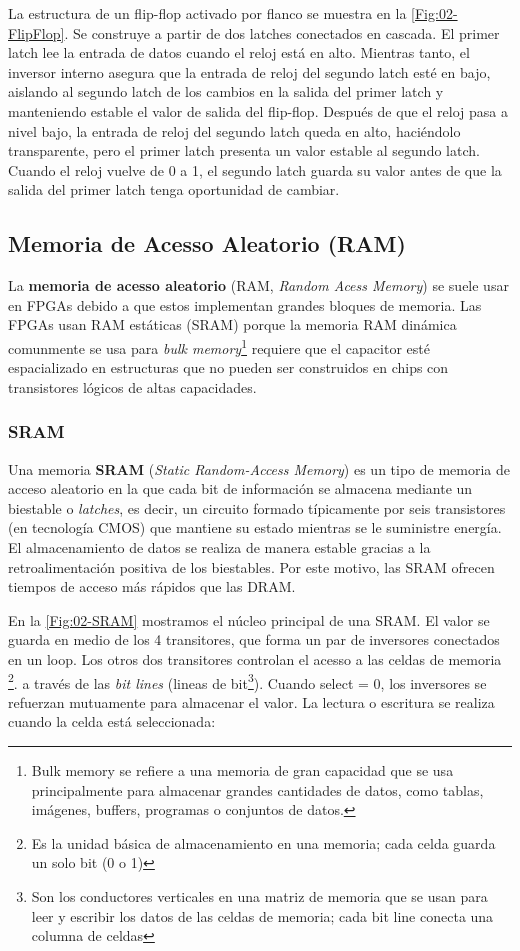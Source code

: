 La estructura de un flip-flop activado por flanco se muestra en la \cref{Fig:02-FlipFlop}. Se construye a partir de dos latches conectados en cascada. El primer latch lee la entrada de datos cuando el reloj está en alto. Mientras tanto, el inversor interno asegura que la entrada de reloj del segundo latch esté en bajo, aislando al segundo latch de los cambios en la salida del primer latch y manteniendo estable el valor de salida del flip-flop. Después de que el reloj pasa a nivel bajo, la entrada de reloj del segundo latch queda en alto, haciéndolo transparente, pero el primer latch presenta un valor estable al segundo latch. Cuando el reloj vuelve de 0 a 1, el segundo latch guarda su valor antes de que la salida del primer latch tenga oportunidad de cambiar.

\subsection{Memoria de Acesso Aleatorio (RAM)}

La \textbf{memoria de acesso aleatorio} (RAM, \textit{Random Acess Memory}) se suele usar en FPGAs debido a que estos implementan grandes bloques de memoria. Las FPGAs usan RAM estáticas (SRAM) porque la memoria RAM dinámica comunmente se usa para \textit{bulk memory}\footnote{Bulk memory se refiere a una memoria de gran capacidad que se usa principalmente para almacenar grandes cantidades de datos, como tablas, imágenes, buffers, programas o conjuntos de datos.} requiere que el capacitor esté espacializado en estructuras que no pueden ser construidos en chips con transistores lógicos de altas capacidades. 



\subsubsection{SRAM}
Una memoria \textbf{SRAM} (\emph{Static Random-Access Memory}) es un tipo de memoria de acceso aleatorio en la que cada bit de información se almacena mediante un biestable o \textit{latches}, es decir, un circuito formado típicamente por seis transistores (en tecnología CMOS) que mantiene su estado mientras se le suministre energía. El almacenamiento de datos se realiza de manera estable gracias a la retroalimentación positiva de los biestables. Por este motivo, las SRAM ofrecen tiempos de acceso más rápidos que las DRAM.

En la \cref{Fig:02-SRAM} mostramos el núcleo principal de una SRAM. El valor se guarda en medio de los 4 transitores, que forma un par de inversores conectados en un loop. Los otros dos transitores controlan el acesso a las {celdas de memoria} \footnote{Es la unidad básica de almacenamiento en una memoria; cada celda guarda un solo bit (0 o 1)}. a través de las \textit{bit lines} (lineas de bit\footnote{Son los conductores verticales en una matriz de memoria que se usan para leer y escribir los datos de las celdas de memoria; cada bit line conecta una columna de celdas}).  Cuando select = 0, los inversores se refuerzan mutuamente para almacenar el valor. La lectura o escritura se realiza cuando la celda está seleccionada:


